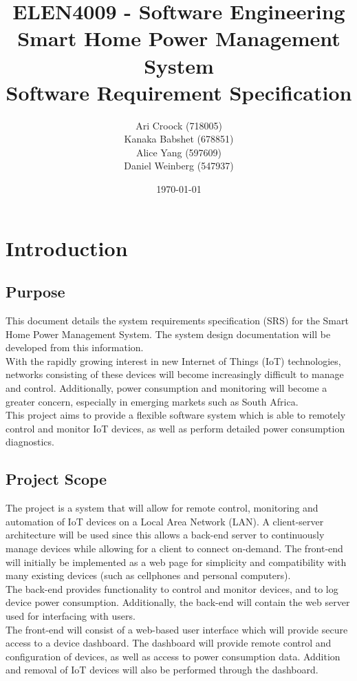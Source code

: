 \documentclass[11pt, a4paper]{article}
\title{ELEN4009 - Software Engineering\\Smart Home Power Management System\\Software Requirement Specification}
\author{Ari Croock (718005)\\Kanaka Babshet (678851)\\Alice Yang (597609)\\Daniel Weinberg (547937)}
\date{\today}
\begin{document}
	\maketitle
	\section{Introduction}
	\subsection{Purpose}
	This document details the system requirements specification (SRS) for the Smart Home Power Management System. The system design documentation will be developed from this information.\\
	\newline 
	\noindent
	With the rapidly growing interest in new Internet of Things (IoT) technologies, networks consisting of these devices will become increasingly difficult to manage and control. Additionally, power consumption and monitoring will become a greater concern, especially in emerging markets such as South Africa.\\
	\newline 
	\noindent
	This project aims to provide a flexible software system which is able to remotely control and monitor IoT devices, as well as perform detailed power consumption diagnostics.
	
	\subsection{Project Scope}
	The project is a system that will allow for remote control, monitoring and automation of IoT devices on a Local Area Network (LAN). A client-server architecture will be used since this allows a back-end server to continuously manage devices while allowing for a client to connect on-demand. The front-end will initially be implemented as a web page for simplicity and compatibility with many existing devices (such as cellphones and personal computers). \\
	\newline 
	\noindent
	The back-end provides functionality to control and monitor devices, and to log device power consumption. Additionally, the back-end will contain the web server used for interfacing with users. \\
	\newline
	\noindent
	The front-end will consist of a web-based user interface which will provide secure access to a device dashboard. The dashboard will provide remote control and configuration of devices, as well as access to power consumption data. Addition and removal of IoT devices will also be performed through the dashboard. 
	
\end{document}
